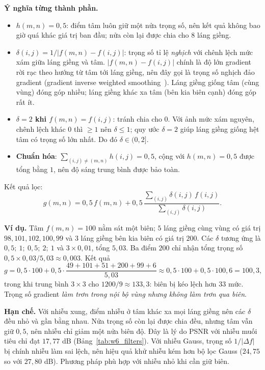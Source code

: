 \textbf{Ý nghĩa từng thành phần.}
\begin{itemize}
    \item \textbf{$h(m, n) = 0{,}5$}: điểm tâm luôn giữ một nửa trọng số, nên kết quả không bao giờ quá khác giá trị ban đầu; nửa còn lại được chia cho $8$ láng giềng.
    \item \textbf{$\delta(i, j) = 1/|f(m, n) - f(i, j)|$}: trọng số tỉ lệ \emph{nghịch} với chênh lệch mức xám giữa láng giềng và tâm. $|f(m, n) - f(i, j)|$ chính là độ lớn gradient rời rạc theo hướng từ tâm tới láng giềng, nên đây gọi là trọng số nghịch đảo gradient (gradient inverse weighted smoothing~\citep{wang1981gradient}). Láng giềng giống tâm (cùng vùng) đóng góp nhiều; láng giềng khác xa tâm (bên kia biên cạnh) đóng góp rất ít.
    \item \textbf{$\delta = 2$ khi $f(m, n) = f(i, j)$}: tránh chia cho $0$. Với ảnh mức xám nguyên, chênh lệch khác $0$ thì $\ge 1$ nên $\delta \le 1$; quy ước $\delta = 2$ giúp láng giềng giống hệt tâm có trọng số lớn nhất. Do đó $\delta \in (0, 2]$.
    \item \textbf{Chuẩn hóa}: $\sum_{(i, j) \ne (m, n)} h(i, j) = 0{,}5$, cộng với $h(m, n) = 0{,}5$ được tổng bằng $1$, nên độ sáng trung bình được bảo toàn.
\end{itemize}
Kết quả lọc:
\begin{equation}
g(m, n) = 0{,}5\,f(m, n) + 0{,}5\,\frac{\sum_{(i, j)} \delta(i, j)\,f(i, j)}{\sum_{(i, j)} \delta(i, j)}.
\end{equation}

\textbf{Ví dụ.} Tâm $f(m, n) = 100$ nằm sát một biên; $5$ láng giềng cùng vùng có giá trị $98, 101, 102, 100, 99$ và $3$ láng giềng bên kia biên có giá trị $200$. Các $\delta$ tương ứng là $0{,}5;\ 1;\ 0{,}5;\ 2;\ 1$ và $3 \times 0{,}01$, tổng $5{,}03$. Ba điểm $200$ chỉ nhận tổng trọng số $0{,}5 \times 0{,}03/5{,}03 \approx 0{,}003$. Kết quả
\[
g = 0{,}5 \cdot 100 + 0{,}5 \cdot \frac{49 + 101 + 51 + 200 + 99 + 6}{5{,}03} \approx 0{,}5 \cdot 100 + 0{,}5 \cdot 100{,}6 = 100{,}3,
\]
trong khi trung bình $3 \times 3$ cho $1200/9 \approx 133{,}3$: biên bị kéo lệch hơn $33$ mức. Trọng số gradient \emph{làm trơn trong nội bộ vùng nhưng không làm trơn qua biên}.

\textbf{Hạn chế.} Với nhiễu xung, điểm nhiễu ở tâm khác xa mọi láng giềng nên các $\delta$ đều nhỏ và gần bằng nhau. Nửa trọng số còn lại được chia đều, nhưng tâm vẫn giữ $0{,}5$, nên nhiễu chỉ giảm một nửa biên độ. Đây là lý do PSNR với nhiễu muối tiêu chỉ đạt $17{,}77$ dB (Bảng~\ref{tab:w6_filters}). Với nhiễu Gauss, trọng số $1/|\Delta f|$ bị chính nhiễu làm sai lệch, nên hiệu quả khử nhiễu kém hơn bộ lọc Gauss ($24{,}75$ so với $27{,}80$ dB). Phương pháp phù hợp với nhiễu nhỏ khi cần giữ biên.


